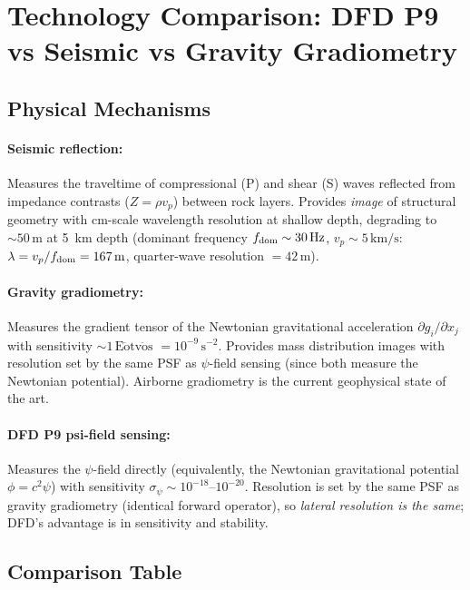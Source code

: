 \documentclass[aps,prd,twocolumn,superscriptaddress,nofootinbib]{revtex4-2}
\begin{document}
\section{Technology Comparison: DFD P9 vs Seismic vs Gravity Gradiometry}
\label{sec:comparison}

\subsection{Physical Mechanisms}

\paragraph{Seismic reflection:} Measures the traveltime of
compressional (P) and shear (S) waves reflected from impedance
contrasts ($Z = \rho v_p$) between rock layers.  Provides
\emph{image} of structural geometry with cm-scale wavelength
resolution at shallow depth, degrading to $\sim 50\,\mathrm{m}$
at 5~km depth (dominant frequency $f_{\rm dom} \sim 30\,\mathrm{Hz}$,
$v_p \sim 5\,\mathrm{km/s}$: $\lambda = v_p/f_{\rm dom} = 167\,\mathrm{m}$,
quarter-wave resolution $= 42\,\mathrm{m}$).

\paragraph{Gravity gradiometry:} Measures the gradient tensor of the
Newtonian gravitational acceleration $\partial g_i/\partial x_j$
with sensitivity $\sim 1\,\mathrm{E\ddot{o}tv\ddot{o}s}$
$= 10^{-9}\,\mathrm{s}^{-2}$.  Provides mass distribution images
with resolution set by the same PSF as $\psi$-field sensing
(since both measure the Newtonian potential).  Airborne gradiometry
is the current geophysical state of the art.

\paragraph{DFD P9 psi-field sensing:} Measures the $\psi$-field
directly (equivalently, the Newtonian gravitational potential
$\phi = c^2\psi$) with sensitivity $\sigma_\psi \sim 10^{-18}$--$10^{-20}$.
Resolution is set by the same PSF as gravity gradiometry (identical
forward operator), so \emph{lateral resolution is the same}; DFD's
advantage is in sensitivity and stability.

\subsection{Comparison Table}
\end{document}
